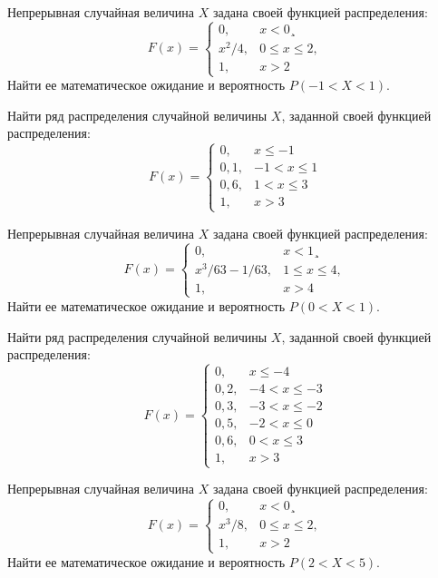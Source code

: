 \vfill

\z Непрерывная случайная величина $X$ задана своей функцией распределения: $$ F(x) = \begin{cases}0, & x < 0¸\\ x^2/4, & 0 \leqslant x \leqslant 2, \\ 1, & x > 2 \end{cases} $$ Найти ее математическое ожидание и вероятность $P(-1 < X < 1)$.
 

\vfill

\newpage\setcounter{zad}{0}

\z Найти ряд распределения случайной величины $X$, заданной своей функцией распределения: $$ F(x) = \begin{cases}0, & x \leqslant -1 \\ 0{,}1, & -1 < x \leqslant 1 \\ 0{,}6, & 1 < x \leqslant 3 \\ 1, & x > 3 \end{cases} $$


\vfill

\z Непрерывная случайная величина $X$ задана своей функцией распределения: $$ F(x) = \begin{cases}0, & x < 1¸\\ x^3/63-1/63, & 1 \leqslant x \leqslant 4, \\ 1, & x > 4 \end{cases} $$ Найти ее математическое ожидание и вероятность $P(0 < X < 1)$.
 

\vfill

\newpage\setcounter{zad}{0}

\z Найти ряд распределения случайной величины $X$, заданной своей функцией распределения: $$ F(x) = \begin{cases}0, & x \leqslant -4 \\ 0{,}2, & -4 < x \leqslant -3 \\ 0{,}3, & -3 < x \leqslant -2 \\ 0{,}5, & -2 < x \leqslant 0 \\ 0{,}6, & 0 < x \leqslant 3 \\ 1, & x > 3 \end{cases} $$


\vfill

\z Непрерывная случайная величина $X$ задана своей функцией распределения: $$ F(x) = \begin{cases}0, & x < 0¸\\ x^3/8, & 0 \leqslant x \leqslant 2, \\ 1, & x > 2 \end{cases} $$ Найти ее математическое ожидание и вероятность $P(2 < X < 5)$.
 

